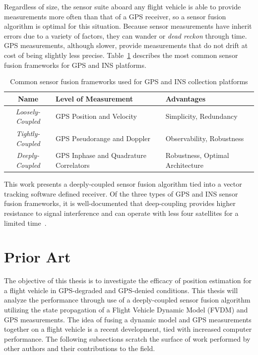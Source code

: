Regardless of size, the sensor suite aboard any flight vehicle is able to provide measurements more often than that of a GPS receiver, so a sensor fusion algorithm is optimal for this situation. Because sensor measurements have inherit errors due to a variety of factors, they can wander or \textit{dead reckon} through time. GPS measurements, although slower, provide measurements that do not drift at cost of being slightly less precise. Table~\ref{tbl:sensorfusionframeworks} describes the most common sensor fusion frameworks for GPS and INS platforms.
\begin{table}[!ht]\label{tbl:sensorfusionframeworks}
    \caption{Common sensor fusion frameworks used for GPS and INS collection platforms}
    \centering
    \begin{tabular}{cll}
        \toprule
        \textbf{Name}            & \textbf{Level of Measurement}          & \textbf{Advantages}              \\
        \midrule
        \textit{Loosely-Coupled} & GPS Position and Velocity              & Simplicity, Redundancy           \\
        \textit{Tightly-Coupled} & GPS Pseudorange and Doppler            & Observability, Robustness        \\
        \textit{Deeply-Coupled}  & GPS Inphase and Quadrature Correlators & Robustness, Optimal Architecture \\
        \bottomrule
    \end{tabular}
\end{table}
This work presents a deeply-coupled sensor fusion algorithm tied into a vector tracking software defined receiver. Of the three types of GPS and INS sensor fusion frameworks, it is well-documented that deep-coupling provides higher resistance to signal interference and can operate with less four satellites for a limited time~\cite{wattsGPSGLONASSL12019}.
\section{Prior Art}
The objective of this thesis is to investigate the efficacy of position estimation for a flight vehicle in GPS-degraded and GPS-denied conditions. This thesis will analyze the performance through use of a deeply-coupled sensor fusion algorithm utilizing the state propagation of a Flight Vehicle Dynamic Model (FVDM) and GPS measurements. The idea of fusing a dynamic model and GPS measurements together on a flight vehicle is a recent development, tied with increased computer performance. The following subsections scratch the surface of work performed by other authors and their contributions to the field.
